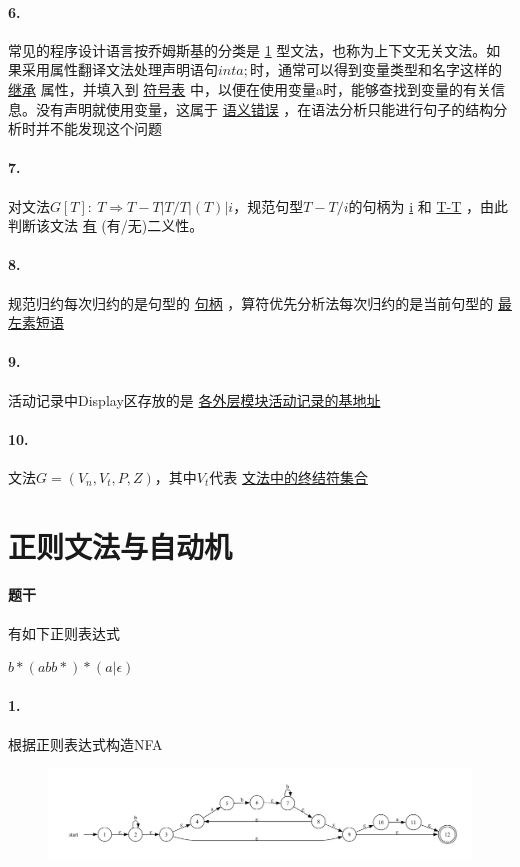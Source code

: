\documentclass[UTF8]{ctexart} %
\begin{document}
\paragraph{6.} 常见的程序设计语言按乔姆斯基的分类是 \underline{1} 型文法，也称为上下文无关文法。如果采用属性翻译文法处理声明语句$int a;$时，通常可以得到变量类型和名字这样的 \underline{继承} 属性，并填入到 \underline{符号表} 中，以便在使用变量a时，能够查找到变量的有关信息。没有声明就使用变量，这属于 \underline{语义错误} ，在语法分析只能进行句子的结构分析时并不能发现这个问题

\paragraph{7.} 对文法$G[T]:\ T\Rightarrow T-T|T/T|(T)|i$，规范句型$T-T/i$的句柄为 \underline{i} 和 \underline{T-T} ，由此判断该文法 \underline{有} (有/无)二义性。

\paragraph{8.} 规范归约每次归约的是句型的 \underline{句柄} ，算符优先分析法每次归约的是当前句型的 \underline{最左素短语}

\paragraph{9.} 活动记录中Display区存放的是 \underline{各外层模块活动记录的基地址}

\paragraph{10.} 文法$G=(V_n,V_t,P,Z)$，其中$V_t$代表 \underline{文法中的终结符集合}

\section{正则文法与自动机}

\paragraph{题干} 有如下正则表达式

$b*(abb*)*(a|\epsilon)$

\paragraph{1.} 根据正则表达式构造NFA

\begin{figure}[H]
    \centering
    \includegraphics[width=\textwidth]{assets/nfa.pdf}
\end{figure}
\end{document}
